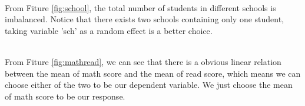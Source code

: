 \documentclass[11pt,a4paper]{article}
\begin{document}
\begin{minipage}{\linewidth}
    \label{fig:school}
\end{minipage}\\

From Fiture \ref{fig:school}, the total number of students in different schools is imbalanced. Notice that there exists two schools 
containing only 
one student, taking variable 'sch' as a random effect is a better choice.\\

\begin{minipage}{\linewidth}
    \label{fig:mathread}
\end{minipage}\\

From Fiture \ref{fig:mathread}, we can see that there is a obvious linear relation between the mean of math score and the mean of read score, 
which means we can choose either of the two to be our dependent variable. We just choose the mean of math score to be our response.\\
\end{document}
